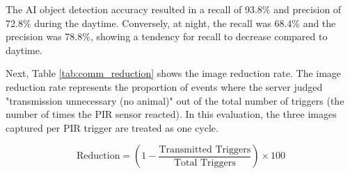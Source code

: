 \documentclass[conference]{IEEEtran}
\begin{document}
\begin{table}[tb]
    \caption{AI Detection Accuracy (Threshold: 0.05)}
    \label{tab:ai_accuracy}
    \vspace{-0.2cm}
    \begin{center}\footnotesize
    \end{center}
    \vspace{-0.4cm}
\end{table}

The AI object detection accuracy resulted in a recall of 93.8\% and precision of 72.8\% during the daytime. Conversely, at night, the recall was 68.4\% and the precision was 78.8\%, showing a tendency for recall to decrease compared to daytime.

Next, Table \ref{tab:comm_reduction} shows the image reduction rate. The image reduction rate represents the proportion of events where the server judged "transmission unnecessary (no animal)" out of the total number of triggers (the number of times the PIR sensor reacted). In this evaluation, the three images captured per PIR trigger are treated as one cycle.

\begin{equation}
    \text{Reduction} = \left( 1 - \frac{\text{Transmitted Triggers}}{\text{Total Triggers}} \right) \times 100 \label{eq:reduction}
\end{equation}
\end{document}
